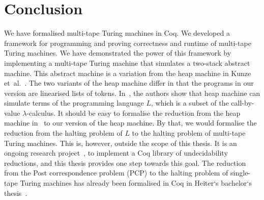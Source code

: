 \chapter{Conclusion}
\label{chap:conclusion}

We have formalised multi-tape Turing machines in Coq.  We developed a framework for programming and proving correctness and runtime of multi-tape
Turing machines.  We have demonstrated the power of this framework by implementing a multi-tape Turing machine that simulates a two-stack abstract
machine.  This abstract machine is a variation from the heap machine in Kunze et~al.~\cite{KunzeEtAl:2018:Formal}.  The two variants of the heap
machine differ in that the programs in our version are linearised lists of tokens.  In~\cite{KunzeEtAl:2018:Formal}, the authors show that heap
machine can simulate terms of the programming language $L$, which is a subset of the call-by-value $\lambda$-calculus.  It should be easy to formalise
the reduction from the heap machine in~\cite{KunzeEtAl:2018:Formal} to our version of the heap machine.  By that, we would formalise the reduction
from the halting problem of $L$ to the halting problem of multi-tape Turing machines.  This is, however, outside the scope of this thesis.  It is an
ongoing research project~\cite{ForsterLOLA}, to implement a Coq library of undecidability reductions, and this thesis provides one step towards this
goal.  The reduction from the Post correspondence problem (PCP) to the halting problem of single-tape Turing machines has already been formalised in
Coq in Heiter`s bachelor`s thesis~\cite{Heiter}.

